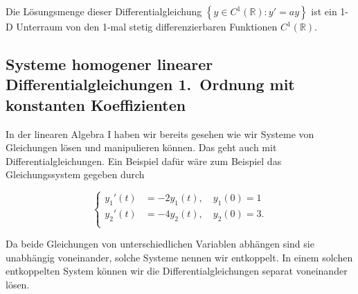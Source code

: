 Die Lösungsmenge dieser Differentialgleichung \( \left\{ y \in C^1(\mathbb{R}): y' = ay \right\} \) ist ein 1-D Unterraum von den 1-mal stetig differenzierbaren Funktionen \( C^1(\mathbb{R}) \).

\subsection{Systeme homogener linearer Differentialgleichungen 1.\ Ordnung mit konstanten Koeffizienten}

In der linearen Algebra I haben wir bereits gesehen wie wir Systeme von Gleichungen lösen und manipulieren können. Das geht auch mit Differentialgleichungen. Ein Beispiel dafür wäre zum Beispiel das Gleichungssystem gegeben durch

\begin{equation*}
    \left\{ 
        \begin{aligned}
            y_1'(t) &= -2 y_1(t), \quad y_1(0) = 1 \\
            y_2'(t) &= -4 y_2(t), \quad y_2(0) = 3. \\
        \end{aligned}
    \right.
\end{equation*}

\vspace{0.5\baselineskip}

Da beide Gleichungen von unterschiedlichen Variablen abhängen sind sie unabhängig voneinander, solche Systeme nennen wir entkoppelt. In einem solchen entkoppelten System können wir die Differentialgleichungen separat voneinander lösen. 

\newpage

